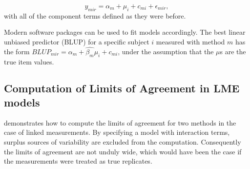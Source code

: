 \documentclass[12pt, a4paper]{report}
\theoremstyle{plain}
\theoremstyle{definition}
\theoremstyle{remark}
\begin{document}
\begin{equation}
y_{mir}  = \alpha_{m} + \mu_{i} + c_{mi} + \epsilon_{mir},
\end{equation}
with all of the component terms defined as they were before.

Modern software packages can be used to fit models accordingly. The best linear unbiased predictor (BLUP) for a specific subject $i$ measured with method $m$ has the form $BLUP_{mir} = \hat{\alpha_{m}} +
\hat{\beta_{m}}\mu_{i} + c_{mi}$, under the assumption that the
$\mu$s are the true item values.



%
%


\subsection{Computation of Limits of Agreement in LME models}


\citet{BXC2008} demonstrates how to compute the limits of agreement for two methods in the case of linked measurements. By specifying a model with interaction terms, surplus sources of variability are excluded from the computation. Consequently the limits of agreement are not unduly wide, which would have been the case if the measurements were treated as true replicates.
\end{document}
